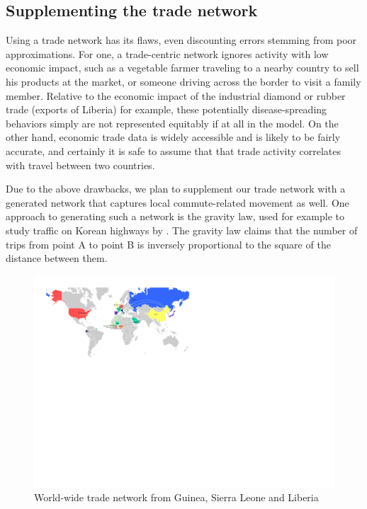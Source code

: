 \documentclass[10pt, journal,onecolumn]{IEEEtran}
\begin{document}
\subsection*{\textbf{Supplementing the trade network}}

Using a trade network has its flaws, even discounting errors stemming from poor approximations.
For one, a trade-centric network ignores activity with low economic impact, such as
a vegetable farmer traveling to a nearby country to sell his products at the market, or someone
driving across the border to visit a family member. Relative to the economic impact of the industrial
diamond or rubber trade (exports of Liberia) for example, these potentially disease-spreading behaviors
simply are not represented equitably if at all in the model. On the other hand, economic trade data is
widely accessible and is likely to be fairly accurate,
and certainly it is safe to assume that that trade activity correlates with travel between two countries.

Due to the above drawbacks, we plan to supplement our trade network with a generated network that
captures local commute-related movement as well. One approach to generating such a network is the gravity law,
used for example to study traffic on Korean highways by \cite{jung2008gravity}. The gravity law
claims that the number of trips from point A to point B is inversely proportional to the square
of the distance between them.

\begin{figure}[ht]
\centering
\includegraphics[scale=1.1]{world1.pdf}
\caption{World-wide trade network from Guinea, Sierra Leone and Liberia}
\label{Fig:worldtrade}
\end{figure}
\end{document}
